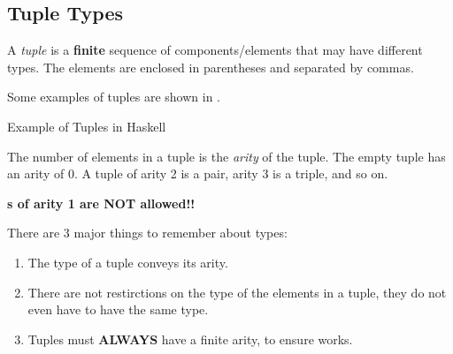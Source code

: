 \subsection{Tuple Types}\label{subsec:Tuple_Types}
\begin{definition}[Tuple]\label{def:Tuple}
  A \emph{tuple} is a \textbf{finite} sequence of components/elements that may have different types.
  The elements are enclosed in parentheses and separated by commas.

  Some examples of tuples are shown in .
\end{definition}

\begin{listing}[h!tbp]
\caption{Example of Tuples in Haskell}
\label{lst:Tuple_Examples}
\end{listing}

The number of elements in a tuple is the \emph{arity} of the tuple.
The empty tuple has an arity of 0.
A tuple of arity 2 is a pair, arity 3 is a triple, and so on.

\begin{blackbox}
  {\large{\textbf{s of arity 1 are NOT allowed!!}}}
\end{blackbox}

There are 3 major things to remember about  types:
\begin{enumerate}[noitemsep]
\item The type of a tuple conveys its arity.
\item There are not restirctions on the type of the elements in a tuple, they do not even have to have the same type.
\item Tuples must \textbf{ALWAYS} have a finite arity, to ensure  works.
\end{enumerate}

